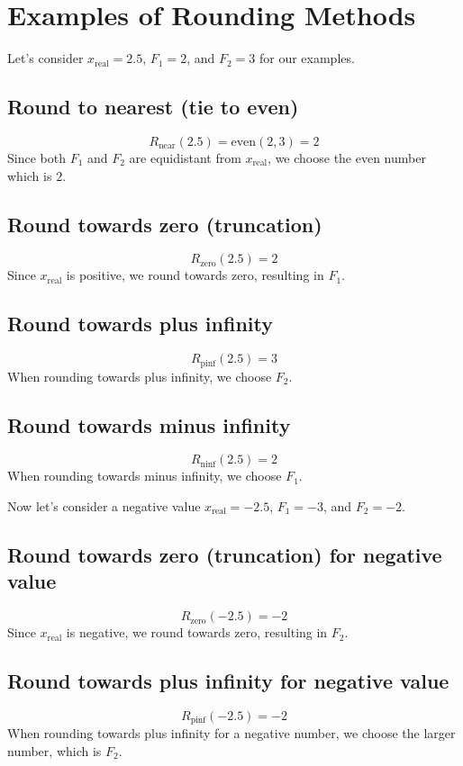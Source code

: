 \documentclass[12pt,openany, tikz,border=10pt]{book}
\begin{document}
\section*{Examples of Rounding Methods}

Let's consider \( x_{\text{real}} = 2.5 \), \( F_1 = 2 \), and \( F_2 = 3 \) for our examples.

\subsection*{Round to nearest (tie to even)}
\[ R_{\text{near}}(2.5) = \text{even}(2, 3) = 2 \]
Since both \( F_1 \) and \( F_2 \) are equidistant from \( x_{\text{real}} \), we choose the even number which is \( 2 \).

\subsection*{Round towards zero (truncation)}
\[ R_{\text{zero}}(2.5) = 2 \]
Since \( x_{\text{real}} \) is positive, we round towards zero, resulting in \( F_1 \).

\subsection*{Round towards plus infinity}
\[ R_{\text{pinf}}(2.5) = 3 \]
When rounding towards plus infinity, we choose \( F_2 \).

\subsection*{Round towards minus infinity}
\[ R_{\text{ninf}}(2.5) = 2 \]
When rounding towards minus infinity, we choose \( F_1 \).

Now let's consider a negative value \( x_{\text{real}} = -2.5 \), \( F_1 = -3 \), and \( F_2 = -2 \).

\subsection*{Round towards zero (truncation) for negative value}
\[ R_{\text{zero}}(-2.5) = -2 \]
Since \( x_{\text{real}} \) is negative, we round towards zero, resulting in \( F_2 \).

\subsection*{Round towards plus infinity for negative value}
\[ R_{\text{pinf}}(-2.5) = -2 \]
When rounding towards plus infinity for a negative number, we choose the larger number, which is \( F_2 \).
\end{document}
